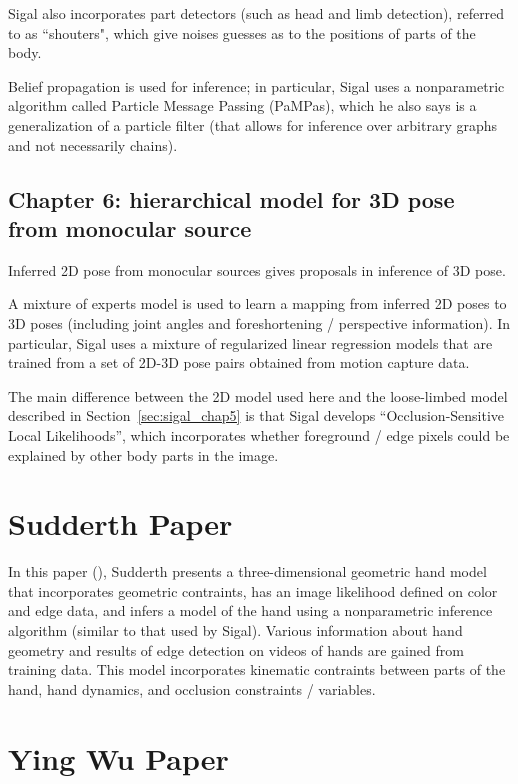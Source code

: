 \documentclass{article}
\begin{document}
Sigal also incorporates part detectors (such as head and limb detection), referred to as ``shouters", which give noises guesses as to the positions of parts of the body.

Belief propagation is used for inference; in particular, Sigal uses a nonparametric algorithm called Particle Message Passing (PaMPas), which he also says is a generalization of a particle filter (that allows for inference over arbitrary graphs and not necessarily chains).


\subsection{Chapter 6: hierarchical model for 3D pose from monocular source}

Inferred 2D pose from monocular sources gives proposals in inference of 3D pose.

A mixture of experts model is used to learn a mapping from inferred 2D poses to 3D poses (including joint angles and foreshortening / perspective information). In particular, Sigal uses a mixture of regularized linear regression models that are trained from a set of 2D-3D pose pairs obtained from motion capture data.

The main difference between the 2D model used here and the loose-limbed model described in Section~\ref{sec:sigal_chap5} is that Sigal develops ``Occlusion-Sensitive Local Likelihoods'', which incorporates whether foreground / edge pixels could be explained by other body parts in the image.



\section{Sudderth Paper}

In this paper (\cite{Sudderth04distributedocclusion}), Sudderth presents a three-dimensional geometric hand model that incorporates geometric contraints, has an image likelihood defined on color and edge data, and infers a model of the hand using a nonparametric inference algorithm (similar to that used by Sigal). Various information about hand geometry and results of edge detection on videos of hands are gained from training data. This model incorporates kinematic contraints between parts of the hand, hand dynamics, and occlusion constraints / variables.


\section{Ying Wu Paper}
\end{document}
